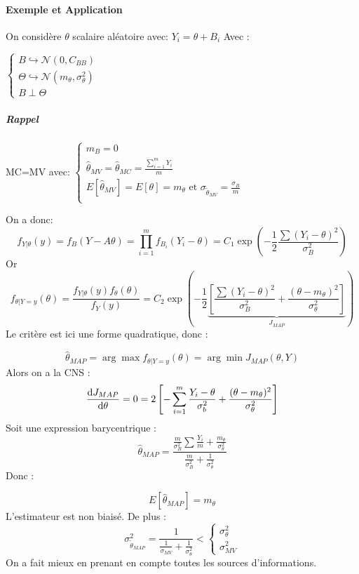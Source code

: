\documentclass[main.tex]{subfiles}
\begin{document}
\paragraph{Exemple et Application}

On considère $\theta$ scalaire aléatoire avec: $Y_i = \theta +B_i$ Avec :

$
\begin{cases}
B \hookrightarrow  \mathcal{N}(0,C_{BB})\\
\Theta \hookrightarrow\mathcal{N}(m_\theta,\sigma_\theta^2) \\
B \perp \Theta
\end{cases}$

\subparagraph{Rappel} MC=MV avec:
$\begin{cases}
m_B=0\\
\hat{\theta}_{MV} =\hat{\theta}_{MC} = \frac{\sum_{i=1}^{m}Y_i}{m}\\

E[\hat{\theta}_{MV}] = E[\theta]=m_\theta \text{ et } \sigma_{\tilde{\theta}_{MV}}=\frac{\sigma_B}{m}\\
\end{cases}$

On a donc:
\[
  f_{Y|\theta}(y)=f_{B}(Y-A\theta) = \prod_{i=1}^{m}f_{B_i}(Y_i-\theta) = C_1 \exp\left(-\frac{1}{2}\frac{\sum(Y_i-\theta)^2}{\sigma_B^2}\right)
\]
Or
\[
  f_{\theta|Y=y}(\theta) = \frac{f_{Y|\theta}(y)f_\theta(\theta)}{f_Y(y)} = C_2 \exp\left(-\frac{1}{2}\underbrace{\left[\frac{\sum(Y_i-\theta)^2}{\sigma_B^2}+\frac{(\theta-m_\theta)^2}{\sigma_\theta^2}\right]}_{J_{MAP}}\right)
\]
Le critère est ici une forme quadratique, donc :

\[
  \hat{\theta}_{MAP} = \arg\max f_{\theta|Y=y}(\theta)  = \arg\min J_{MAP}(\theta,Y)
\]
Alors on a la CNS :
\[
\deriv[J_{MAP}]{\theta} = 0 = 2 \left[ -\sum_{i=1}^{m}\frac{Y_i-\theta}{\sigma_b^2}+\frac{(\theta-m_\theta)^2}{\sigma_\theta^2}\right]
\]
Soit une expression barycentrique :
\[
  \hat{\theta}_{MAP} = \frac{\frac{m}{\sigma_B^2}\sum_{}^{}\frac{Y_i}{m}+\frac{m_\theta}{\sigma_\theta^2}}{\frac{m}{\sigma_B^2}+\frac{1}{\sigma_\theta^2}}
\]
Donc :
\begin{prop}
\[
E[\hat{\theta}_{MAP}]  = m_\theta
\]
L'estimateur est non biaisé. De plus :
\[
  \sigma_{\tilde{\theta}_{MAP}}^2= \frac{1}{\frac{1}{\sigma_{MV}}+\frac{1}{\sigma_\theta^2}} <
  \begin{cases}
    \sigma_\theta^2 \\
    \sigma_{MV}^2
  \end{cases}
\]
On a fait mieux en prenant en compte toutes les sources d'informations.
\end{prop}
\end{document}
